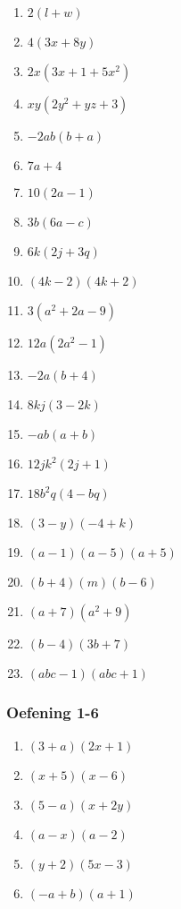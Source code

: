 {\begin{multicols}{3}
\begin{enumerate}[noitemsep, label=\textbf{\arabic*}. ] 
\item $2(l + w)$%
\item $4(3x + 8y)$%
\item $2x(3x + 1 +5x^2)$%
\item $xy(2y^2 + yz + 3)$%
\item $-2ab(b + a)$%
\item $7a + 4$%
\item $10(2a - 1)$%
\item $3b(6a - c)$%
\item $6k(2j + 3q)$%
\item $(4k - 2)(4k + 2)$%
\item $3(a^2 + 2a - 9)$%
\item $12a( 2a^2 -1)$%
\item $-2a(b + 4)$%
\item $8kj(3 - 2k)$%
\item $-ab(a + b)$%
\item $12jk^2(2j+1)$%
\item $18b^2q(4 - bq)$%
\item $(3 - y)(-4 + k)$%
\item $(a - 1)(a - 5)(a + 5)$%
\item $(b + 4)(m)(b - 6)$%
\item $(a + 7)(a^2 + 9)$ %
\item $(b - 4)(3b + 7)$%
\item $(abc - 1)(abc + 1)$%
\end{enumerate}


\subsubsection*{Oefening 1-6} %


\begin{enumerate}[noitemsep, label=\textbf{\arabic*}. ] 
\item $(3 + a)(2x + 1)$%
\item $(x + 5)(x - 6)$%
\item $(5 - a)(x + 2y)$%
\item $(a - x)(a - 2)$%
\item $(y + 2)(5x - 3)$%
\item $(-a + b)(a + 1)$%
\end{enumerate}




\end{multicols}}

